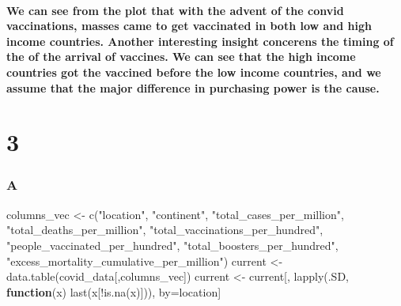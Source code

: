\documentclass[
]{article}
\newenvironment{Shaded}{\begin{snugshade}}{\end{snugshade}}
\newcommand{\ControlFlowTok}[1]{\textcolor[rgb]{0.13,0.29,0.53}{\textbf{#1}}}
\newcommand{\FunctionTok}[1]{\textcolor[rgb]{0.00,0.00,0.00}{#1}}
\newcommand{\NormalTok}[1]{#1}
\newcommand{\OtherTok}[1]{\textcolor[rgb]{0.56,0.35,0.01}{#1}}
\newcommand{\SpecialCharTok}[1]{\textcolor[rgb]{0.00,0.00,0.00}{#1}}
\newcommand{\StringTok}[1]{\textcolor[rgb]{0.31,0.60,0.02}{#1}}
\begin{document}
\hypertarget{we-can-see-from-the-plot-that-with-the-advent-of-the-convid-vaccinations-masses-came-to-get-vaccinated-in-both-low-and-high-income-countries.-another-interesting-insight-concerens-the-timing-of-the-of-the-arrival-of-vaccines.-we-can-see-that-the-high-income-countries-got-the-vaccined-before-the-low-income-countries-and-we-assume-that-the-major-difference-in-purchasing-power-is-the-cause.}{%
\paragraph{We can see from the plot that with the advent of the convid
vaccinations, masses came to get vaccinated in both low and high income
countries. Another interesting insight concerens the timing of the of
the arrival of vaccines. We can see that the high income countries got
the vaccined before the low income countries, and we assume that the
major difference in purchasing power is the
cause.}\label{we-can-see-from-the-plot-that-with-the-advent-of-the-convid-vaccinations-masses-came-to-get-vaccinated-in-both-low-and-high-income-countries.-another-interesting-insight-concerens-the-timing-of-the-of-the-arrival-of-vaccines.-we-can-see-that-the-high-income-countries-got-the-vaccined-before-the-low-income-countries-and-we-assume-that-the-major-difference-in-purchasing-power-is-the-cause.}}

\hypertarget{section-2}{%
\section{3}\label{section-2}}

\hypertarget{a-2}{%
\subsubsection{A}\label{a-2}}

\begin{Shaded}
\begin{Highlighting}[]
\NormalTok{columns\_vec }\OtherTok{\textless{}{-}} \FunctionTok{c}\NormalTok{(}\StringTok{"location"}\NormalTok{, }\StringTok{"continent"}\NormalTok{, }\StringTok{"total\_cases\_per\_million"}\NormalTok{, }\StringTok{"total\_deaths\_per\_million"}\NormalTok{, }\StringTok{"total\_vaccinations\_per\_hundred"}\NormalTok{, }\StringTok{"people\_vaccinated\_per\_hundred"}\NormalTok{, }\StringTok{"total\_boosters\_per\_hundred"}\NormalTok{, }\StringTok{"excess\_mortality\_cumulative\_per\_million"}\NormalTok{)}
\NormalTok{current }\OtherTok{\textless{}{-}} \FunctionTok{data.table}\NormalTok{(covid\_data[,columns\_vec])}
\NormalTok{current }\OtherTok{\textless{}{-}}\NormalTok{ current[, }\FunctionTok{lapply}\NormalTok{(.SD, }\ControlFlowTok{function}\NormalTok{(x) }\FunctionTok{last}\NormalTok{(x[}\SpecialCharTok{!}\FunctionTok{is.na}\NormalTok{(x)])), by}\OtherTok{=}\NormalTok{location]}
\end{Highlighting}
\end{Shaded}
\end{document}
